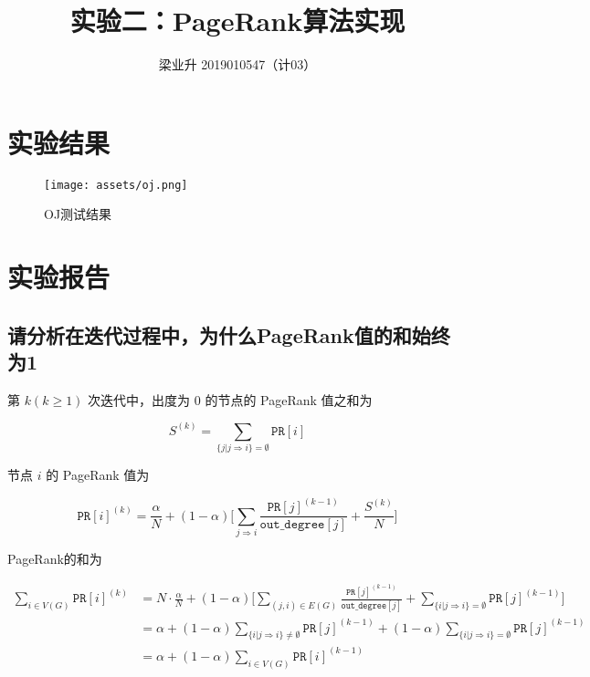 \documentclass[a4paper]{article}
\begin{document}
\title{实验二：PageRank算法实现}
\author{梁业升 2019010547（计03）}

\maketitle

\section{实验结果}

\begin{figure}[!htbp]
    \centering
    \texttt{[image: assets/oj.png]}
    \caption{OJ测试结果}
\end{figure}

\section{实验报告}

\subsection{请分析在迭代过程中，为什么PageRank值的和始终为1}

第 $k(k\ge 1)$ 次迭代中，出度为 0 的节点的 PageRank 值之和为

\begin{equation*}
    S^{(k)}=\sum_{\{j|j\Rightarrow i\}=\emptyset}\texttt{PR}[i]
\end{equation*}

节点 $i$ 的 PageRank 值为

\begin{equation*}
    \texttt{PR}[i]^{(k)}=\frac{\alpha}{N}+(1-\alpha)
        \Big [\sum_{j\Rightarrow i}\frac{\texttt{PR}[j]^{(k-1)}}{\texttt{out\_degree}[j]}
     + \frac{S^{(k)}}{N} \Big]
\end{equation*}

PageRank的和为

\begin{equation*}
    \begin{split}
        \sum_{i\in V(G)} \texttt{PR}[i]^{(k)} & = N\cdot\frac{\alpha}{N}
            + (1-\alpha) \Big[\sum_{(j,i)\in E(G)}\frac{\texttt{PR}[j]^{(k-1)}}{\texttt{out\_degree}[j]}
            + \sum_{\{i|j\Rightarrow i\}=\emptyset}\texttt{PR}[j]^{(k-1)} \Big]
        \\ & = \alpha + (1-\alpha)\sum_{\{i|j\Rightarrow i\}\neq\emptyset}\texttt{PR}[j]^{(k-1)}
            + (1-\alpha)\sum_{\{i|j\Rightarrow i\}=\emptyset}\texttt{PR}[j]^{(k-1)}
        \\ & = \alpha + (1-\alpha) \sum_{i\in V(G)} \texttt{PR}[i]^{(k-1)}
    \end{split}
\end{equation*}
\end{document}
